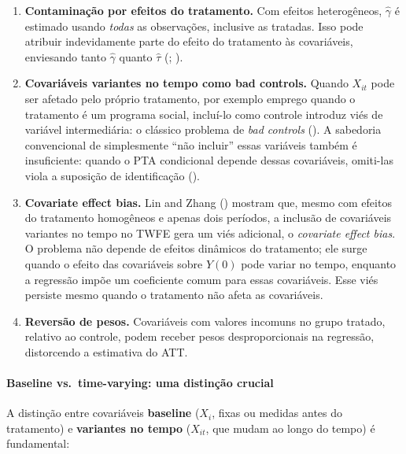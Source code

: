 \documentclass[
]{article}
\begin{document}
\begin{enumerate}
\def\labelenumi{\arabic{enumi}.}
\item
  \textbf{Contaminação por efeitos do tratamento.} Com efeitos heterogêneos, \(\hat{\gamma}\) é estimado usando \emph{todas} as observações, inclusive as tratadas. Isso pode atribuir indevidamente parte do efeito do tratamento às covariáveis, enviesando tanto \(\hat{\gamma}\) quanto \(\hat{\tau}\) (; ).
\item
  \textbf{Covariáveis variantes no tempo como bad controls.} Quando \(X_{it}\) pode ser afetado pelo próprio tratamento, por exemplo emprego quando o tratamento é um programa social, incluí-lo como controle introduz viés de variável intermediária: o clássico problema de \emph{bad controls} (). A sabedoria convencional de simplesmente ``não incluir'' essas variáveis também é insuficiente: quando o PTA condicional depende dessas covariáveis, omiti-las viola a suposição de identificação ().
\item
  \textbf{Covariate effect bias.} Lin and Zhang () mostram que, mesmo com efeitos do tratamento homogêneos e apenas dois períodos, a inclusão de covariáveis variantes no tempo no TWFE gera um viés adicional, o \emph{covariate effect bias}. O problema não depende de efeitos dinâmicos do tratamento; ele surge quando o efeito das covariáveis sobre \(Y(0)\) pode variar no tempo, enquanto a regressão impõe um coeficiente comum para essas covariáveis. Esse viés persiste mesmo quando o tratamento não afeta as covariáveis.
\item
  \textbf{Reversão de pesos.} Covariáveis com valores incomuns no grupo tratado, relativo ao controle, podem receber pesos desproporcionais na regressão, distorcendo a estimativa do ATT.
\end{enumerate}

\paragraph{Baseline vs.~time-varying: uma distinção crucial}\label{baseline-vs.-time-varying-uma-distinuxe7uxe3o-crucial}

A distinção entre covariáveis \textbf{baseline} (\(X_i\), fixas ou medidas antes do tratamento) e \textbf{variantes no tempo} (\(X_{it}\), que mudam ao longo do tempo) é fundamental:
\end{document}
